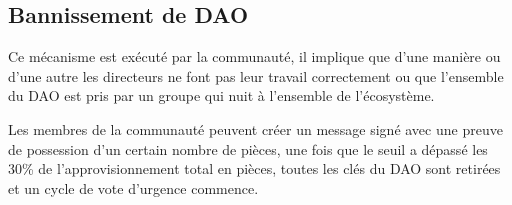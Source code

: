 \documentclass{article}
\begin{document}
\subsection{Bannissement de DAO}

Ce mécanisme est exécuté par la communauté, il implique que d'une manière ou d'une autre les directeurs ne font pas leur travail correctement ou que l'ensemble du DAO est pris par un groupe qui nuit à l'ensemble de l'écosystème.

Les membres de la communauté peuvent créer un message signé avec une preuve de possession d'un certain nombre de pièces, une fois que le seuil a dépassé les 30\% de l'approvisionnement total en pièces, toutes les clés du DAO sont retirées et un cycle de vote d'urgence commence.
\end{document}
